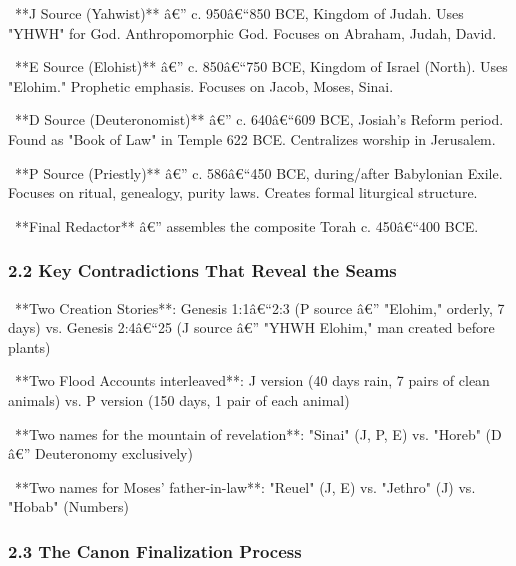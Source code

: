 \documentclass[aps,prd,11pt,onecolumn,superscriptaddress,nofootinbib,floatfix]{revtex4-2}
\begin{document}
\textbullet~**J Source (Yahwist)** â€'' c. 950â€``850 BCE, Kingdom of Judah. Uses "YHWH" for God. Anthropomorphic God. Focuses on Abraham, Judah, David.

\textbullet~**E Source (Elohist)** â€'' c. 850â€``750 BCE, Kingdom of Israel (North). Uses "Elohim." Prophetic emphasis. Focuses on Jacob, Moses, Sinai.

\textbullet~**D Source (Deuteronomist)** â€'' c. 640â€``609 BCE, Josiah's Reform period. Found as "Book of Law" in Temple 622 BCE. Centralizes worship in Jerusalem.

\textbullet~**P Source (Priestly)** â€'' c. 586â€``450 BCE, during/after Babylonian Exile. Focuses on ritual, genealogy, purity laws. Creates formal liturgical structure.

\textbullet~**Final Redactor** â€'' assembles the composite Torah c. 450â€``400 BCE.



\subsubsection{2.2 Key Contradictions That Reveal the Seams}


\textbullet~**Two Creation Stories**: Genesis 1:1â€``2:3 (P source â€'' "Elohim," orderly, 7 days) vs. Genesis 2:4â€``25 (J source â€'' "YHWH Elohim," man created before plants)

\textbullet~**Two Flood Accounts interleaved**: J version (40 days rain, 7 pairs of clean animals) vs. P version (150 days, 1 pair of each animal)

\textbullet~**Two names for the mountain of revelation**: "Sinai" (J, P, E) vs. "Horeb" (D â€'' Deuteronomy exclusively)

\textbullet~**Two names for Moses' father-in-law**: "Reuel" (J, E) vs. "Jethro" (J) vs. "Hobab" (Numbers)



\subsubsection{2.3 The Canon Finalization Process}
\end{document}
